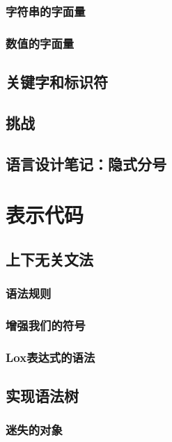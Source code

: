 \documentclass[cn,10pt,math=newtx,citestyle=gb7714-2015,bibstyle=gb7714-2015]{elegantbook}
\begin{document}
\subsection{字符串的字面量}

\subsection{数值的字面量}

\section{关键字和标识符}

\section{挑战}

\section{语言设计笔记：隐式分号}

\chapter{表示代码}

\section{上下无关文法}

\subsection{语法规则}

\subsection{增强我们的符号}

\subsection{Lox表达式的语法}

\section{实现语法树}

\subsection{迷失的对象}
\end{document}
